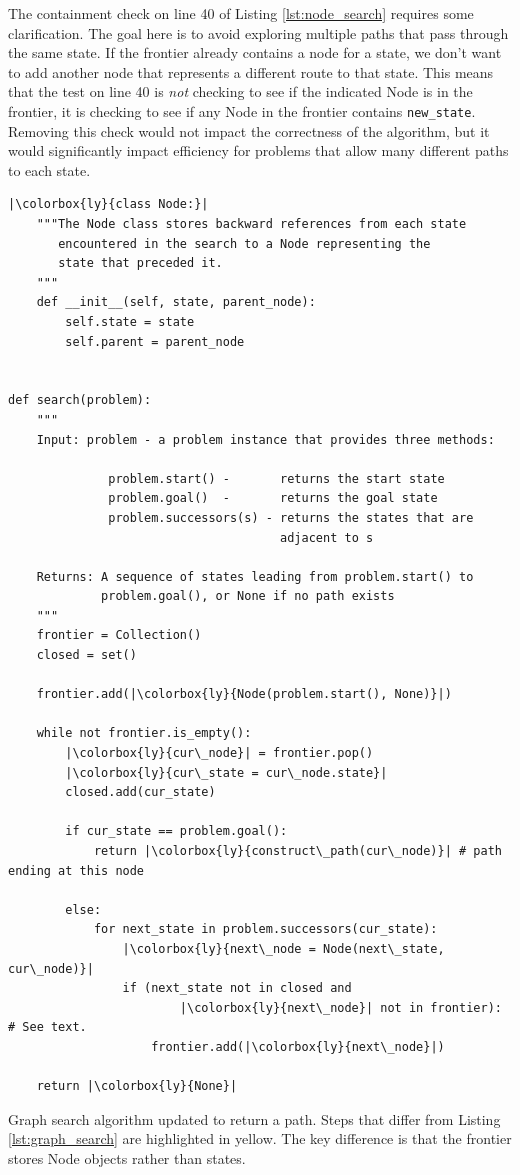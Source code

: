 The containment check on line 40 of Listing \ref{lst:node_search}
requires some clarification.  The goal here is to avoid exploring
multiple paths that pass through the same state.  If the frontier
already contains a node for a state, we don't want to add another node
that represents a different route to that state.  This means that the
test on line 40 is \emph{not} checking to see if the indicated Node is
in the frontier, it is checking to see if any Node in the frontier
contains \mintinline {python}{new_state}.  Removing this check would
not impact the correctness of the algorithm, but it would
significantly impact efficiency for problems that allow many different
paths to each state.


\begin{listing}[H]
  \begin{verbatim}
|\colorbox{ly}{class Node:}|
    """The Node class stores backward references from each state
       encountered in the search to a Node representing the
       state that preceded it.
    """    
    def __init__(self, state, parent_node):
        self.state = state
        self.parent = parent_node


def search(problem):
    """
    Input: problem - a problem instance that provides three methods:

              problem.start() -       returns the start state
              problem.goal()  -       returns the goal state
              problem.successors(s) - returns the states that are 
                                      adjacent to s

    Returns: A sequence of states leading from problem.start() to 
             problem.goal(), or None if no path exists
    """
    frontier = Collection()
    closed = set()

    frontier.add(|\colorbox{ly}{Node(problem.start(), None)}|)    

    while not frontier.is_empty():
        |\colorbox{ly}{cur\_node}| = frontier.pop()
        |\colorbox{ly}{cur\_state = cur\_node.state}|
        closed.add(cur_state)

        if cur_state == problem.goal():
            return |\colorbox{ly}{construct\_path(cur\_node)}| # path ending at this node
        
        else:
            for next_state in problem.successors(cur_state):
                |\colorbox{ly}{next\_node = Node(next\_state, cur\_node)}|
                if (next_state not in closed and
                        |\colorbox{ly}{next\_node}| not in frontier): # See text.
                    frontier.add(|\colorbox{ly}{next\_node}|)

    return |\colorbox{ly}{None}|

\end{verbatim}
\caption{Graph search algorithm updated to return a path.  Steps that
  differ from Listing \ref{lst:graph_search} are highlighted in
  yellow.  The key difference is that the frontier stores Node objects
  rather than states.}
\label{lst:node_search}
\end{listing}

